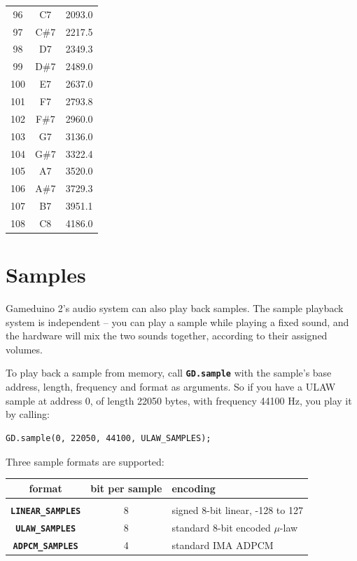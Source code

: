 \documentclass[10pt]{book}
\newcommand{\gdtwos}{Gameduino 2's }
\newcommand{\mach}[1]{\texttt{\textbf{#1}}}
\begin{document}
\begin{CJK}{UTF8}{gkai}
\begin{spacing}{0.99}
\begin{supertabular}{ccc}
96  & C7  & 2093.0 \\
97  & C\#7 & 2217.5 \\
98  & D7  & 2349.3 \\
99  & D\#7 & 2489.0 \\
100 & E7  & 2637.0 \\
101 & F7  & 2793.8 \\
102 & F\#7 & 2960.0 \\
103 & G7  & 3136.0 \\
104 & G\#7 & 3322.4 \\
105 & A7  & 3520.0 \\
106 & A\#7 & 3729.3 \\
107 & B7  & 3951.1 \\
108 & C8  & 4186.0 \\
\end{supertabular}
\end{spacing}
\onecolumn
\normalsize

\section{Samples}

\gdtwos audio system can also play back samples.
The sample playback system is independent -- you can play a sample while playing a fixed sound, and the
hardware will mix the two sounds together, according to their assigned volumes.

To play back a sample from memory, call \mach{GD.sample} with the
sample's base address, length, frequency and format as arguments.
So if you have a ULAW sample at address 0, of length 22050 bytes,
with frequency 44100 Hz, you play it by calling:

\begin{framed}
\begin{verbatim}
GD.sample(0, 22050, 44100, ULAW_SAMPLES);
\end{verbatim}
\end{framed}

Three sample formats are supported:

\vspace{10pt}
\begin{tabular}{ccl}
format & bit per sample & encoding \\
\hline \\
\mach{LINEAR\_SAMPLES} & 8 & signed 8-bit linear, -128 to 127 \\
\mach{ULAW\_SAMPLES} & 8 & standard 8-bit encoded $\mu$-law \\
\mach{ADPCM\_SAMPLES} & 4 & standard IMA ADPCM \\
\end{tabular}
\vspace{10pt}


\end{CJK}
\end{document}
